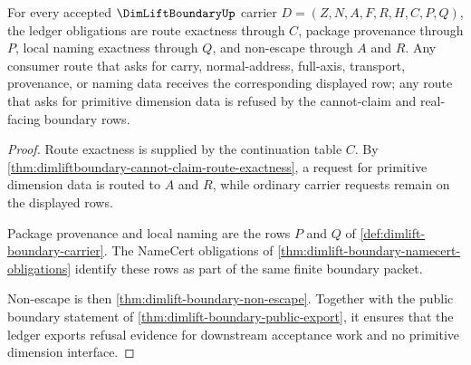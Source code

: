 \begin{theorem}
\label{thm:dimliftboundary-obligation-ledger}
For every accepted $\DimLiftBoundaryUp$ carrier $D=(Z,N,A,F,R,H,C,P,Q)$, the ledger obligations are route exactness through $C$, package provenance through $P$, local naming exactness through $Q$, and non-escape through $A$ and $R$. Any consumer route that asks for carry, normal-address, full-axis, transport, provenance, or naming data receives the corresponding displayed row; any route that asks for primitive dimension data is refused by the cannot-claim and real-facing boundary rows.
\end{theorem}
\begin{proof}
Route exactness is supplied by the continuation table $C$. By \autoref{thm:dimliftboundary-cannot-claim-route-exactness}, a request for primitive dimension data is routed to $A$ and $R$, while ordinary carrier requests remain on the displayed rows.

Package provenance and local naming are the rows $P$ and $Q$ of \autoref{def:dimlift-boundary-carrier}. The NameCert obligations of \autoref{thm:dimlift-boundary-namecert-obligations} identify these rows as part of the same finite boundary packet.

Non-escape is then \autoref{thm:dimlift-boundary-non-escape}. Together with the public boundary statement of \autoref{thm:dimlift-boundary-public-export}, it ensures that the ledger exports refusal evidence for downstream acceptance work and no primitive dimension interface.
\end{proof}


\begin{closurestatus}{\DimLiftBoundaryUp}
  \theoryclosure{\seedClosure}
  \formalstatus{\unformalizedV}
\end{closurestatus}
